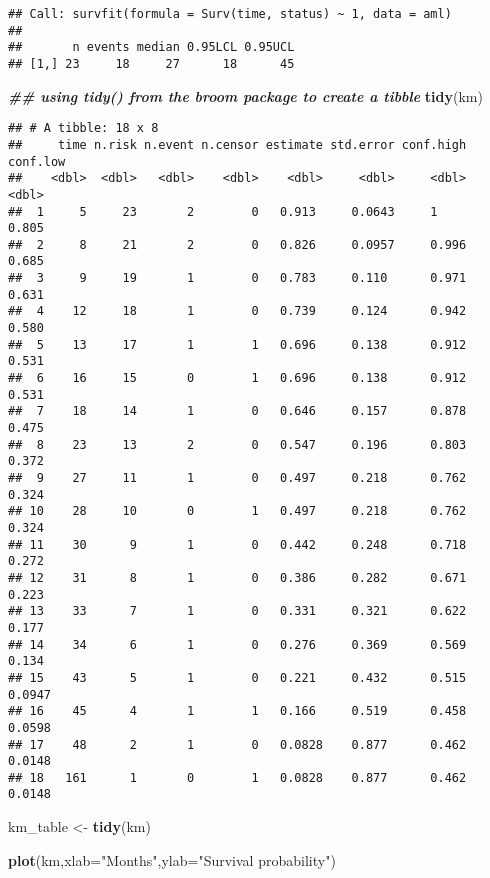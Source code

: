 \documentclass[
]{article}
\newenvironment{Shaded}{\begin{snugshade}}{\end{snugshade}}
\newcommand{\AttributeTok}[1]{\textcolor[rgb]{0.13,0.29,0.53}{#1}}
\newcommand{\DocumentationTok}[1]{\textcolor[rgb]{0.56,0.35,0.01}{\textbf{\textit{#1}}}}
\newcommand{\FunctionTok}[1]{\textcolor[rgb]{0.13,0.29,0.53}{\textbf{#1}}}
\newcommand{\NormalTok}[1]{#1}
\newcommand{\OtherTok}[1]{\textcolor[rgb]{0.56,0.35,0.01}{#1}}
\newcommand{\StringTok}[1]{\textcolor[rgb]{0.31,0.60,0.02}{#1}}
\begin{document}
\begin{verbatim}
## Call: survfit(formula = Surv(time, status) ~ 1, data = aml)
## 
##       n events median 0.95LCL 0.95UCL
## [1,] 23     18     27      18      45
\end{verbatim}

\begin{Shaded}
\begin{Highlighting}[]
\DocumentationTok{\#\# using tidy() from the broom package to create a tibble}
\FunctionTok{tidy}\NormalTok{(km)}
\end{Highlighting}
\end{Shaded}

\begin{verbatim}
## # A tibble: 18 x 8
##     time n.risk n.event n.censor estimate std.error conf.high conf.low
##    <dbl>  <dbl>   <dbl>    <dbl>    <dbl>     <dbl>     <dbl>    <dbl>
##  1     5     23       2        0   0.913     0.0643     1       0.805 
##  2     8     21       2        0   0.826     0.0957     0.996   0.685 
##  3     9     19       1        0   0.783     0.110      0.971   0.631 
##  4    12     18       1        0   0.739     0.124      0.942   0.580 
##  5    13     17       1        1   0.696     0.138      0.912   0.531 
##  6    16     15       0        1   0.696     0.138      0.912   0.531 
##  7    18     14       1        0   0.646     0.157      0.878   0.475 
##  8    23     13       2        0   0.547     0.196      0.803   0.372 
##  9    27     11       1        0   0.497     0.218      0.762   0.324 
## 10    28     10       0        1   0.497     0.218      0.762   0.324 
## 11    30      9       1        0   0.442     0.248      0.718   0.272 
## 12    31      8       1        0   0.386     0.282      0.671   0.223 
## 13    33      7       1        0   0.331     0.321      0.622   0.177 
## 14    34      6       1        0   0.276     0.369      0.569   0.134 
## 15    43      5       1        0   0.221     0.432      0.515   0.0947
## 16    45      4       1        1   0.166     0.519      0.458   0.0598
## 17    48      2       1        0   0.0828    0.877      0.462   0.0148
## 18   161      1       0        1   0.0828    0.877      0.462   0.0148
\end{verbatim}

\begin{Shaded}
\begin{Highlighting}[]
\NormalTok{km\_table }\OtherTok{\textless{}{-}} \FunctionTok{tidy}\NormalTok{(km)}

\FunctionTok{plot}\NormalTok{(km,}\AttributeTok{xlab=}\StringTok{"Months"}\NormalTok{,}\AttributeTok{ylab=}\StringTok{"Survival probability"}\NormalTok{)}
\end{Highlighting}
\end{Shaded}
\end{document}
